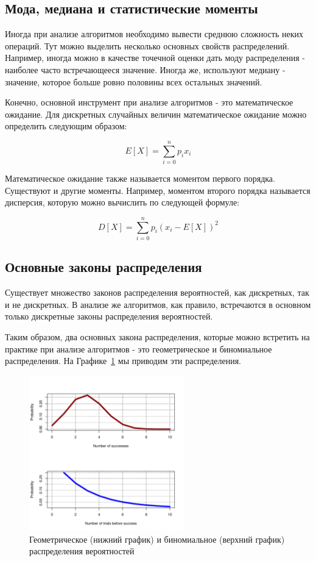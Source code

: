 \subsection{Мода, медиана и статистические моменты}

Иногда при анализе алгоритмов необходимо вывести среднюю сложность 
неких операций. Тут можно выделить несколько основных свойств распределений.
Например, иногда можно в качестве точечной оценки дать моду распределения - 
наиболее часто встречающееся значение. Иногда же, используют медиану - 
значение, которое больше ровно половины всех остальных значений. 

Конечно, основной инструмент при анализе алгоритмов - это математическое 
ожидание. Для дискретных случайных величин математическое ожидание 
можно определить следующим образом:

$$E[X]=\sum_{i=0}^{n}p_ix_i$$

Математическое ожидание также называется моментом первого порядка. 
Существуют и другие моменты. Например, моментом второго порядка называется
дисперсия, которую можно вычислить по следующей формуле:

$$D[X] = \sum_{i=0}^{n}p_i(x_i-E[X])^2$$

\subsection{Основные законы распределения}

Существует множество законов распределения вероятностей, как дискретных, 
так и не дискретных. В анализе же алгоритмов, как правило, встречаются
в основном только дискретные законы распределения вероятностей.

Таким образом, два основных закона распределения, которые можно встретить на практике
при анализе алгоритмов - это геометрическое и биномиальное распределения.
На Графике~\ref{fig:distributions} мы приводим эти распределения.

\begin{figure}[ht!]
\centering
\includegraphics[width=0.6\textwidth]{graphics/distributions.pdf}
\caption{Геометрическое (нижний график) и биномиальное (верхний график) распределения вероятностей}
\label{fig:distributions}
\end{figure}

